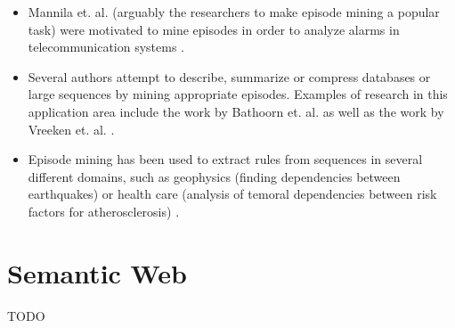 \begin{itemize}
	\item Mannila et. al. (arguably the researchers to make episode mining a popular task) were motivated to mine episodes in order to analyze alarms in telecommunication systems \cite{mannila1997discovery}.
	\item Several authors attempt to describe, summarize or compress databases or large sequences by mining appropriate episodes. Examples of research in this application area include the work by Bathoorn et. al. \cite{bathoorn2007finding} as well as the work by Vreeken et. al. \cite{vreeken2012summarising}.
	\item Episode mining has been used to extract rules from sequences in several different domains, such as geophysics (finding dependencies between earthquakes) \cite{meger2004constraint} or health care (analysis of temoral dependencies between risk factors for atherosclerosis) \cite{meger2004mining}.
\end{itemize}

\section{Semantic Web}
\label{subsec_semanticWeb}
TODO






